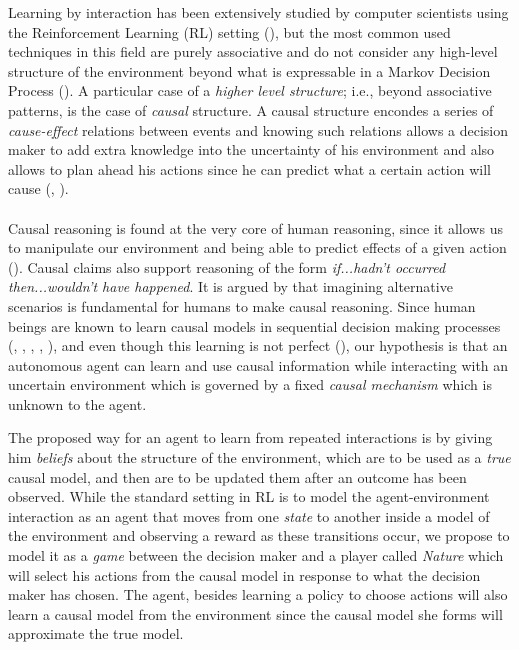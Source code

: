 \documentclass[english,letterpaper,12pt,final]{article}
\theoremstyle{definition}
\begin{document}

Learning by interaction has been extensively studied by computer scientists using the Reinforcement Learning (RL) setting (\cite{sutton1998reinforcement}), but the most common used techniques  in this field are purely associative and do not consider any high-level structure of the environment beyond what is expressable in a Markov Decision Process (\cite{garnelo2016towards}). A particular case of a \textit{higher level structure}; i.e., beyond associative patterns, is the case of \textit{causal} structure. A causal structure encondes a series of \textit{cause-effect} relations between events and knowing such relations allows a decision maker to add extra knowledge into the uncertainty of his environment and also allows to plan ahead his actions since he can predict what a certain action will cause (\cite{spirtes2000causation}, \cite{pearl2018theoretical}).\\
\\
Causal reasoning is found at the very core of human reasoning, since it allows us to manipulate our environment and being able to predict effects of a given action (\cite{spirtes2000causation}). Causal claims also support reasoning of the form \textit{if...hadn't occurred then...wouldn't have happened}. It is argued by \cite{pearl2018why} that imagining alternative scenarios is fundamental for humans to make causal reasoning.  Since human beings are known to learn causal models in sequential decision making processes (\cite{sloman2006causal}, \cite{nichols2007decision}, \cite{meder2010observing}, \cite{hagmayer2013repeated}, \cite{danks2014unifying}), and even though this learning is not perfect (\cite{rottman2014reasoning}), our hypothesis is that an autonomous agent can learn and use causal information while interacting with an uncertain environment which is governed by a fixed \textit{causal mechanism} which is unknown to the agent.  

The proposed way for an agent to learn from repeated interactions is by giving him \textit{beliefs} about the structure of the environment, which are to be used as a \textit{true} causal model, and then are to be updated them after an outcome has been observed. While the standard setting in RL is to model the agent-environment interaction as an agent that moves from one \textit{state} to another inside a model of the environment and observing a reward as these transitions occur, we propose to model it as a \textit{game} between the decision maker and a player called \textit{Nature} which will select his actions from the causal model in response to what the decision maker has chosen. The agent, besides learning a policy to choose actions will also learn a causal model from the environment since the causal model she forms will approximate the true model.
\end{document}
